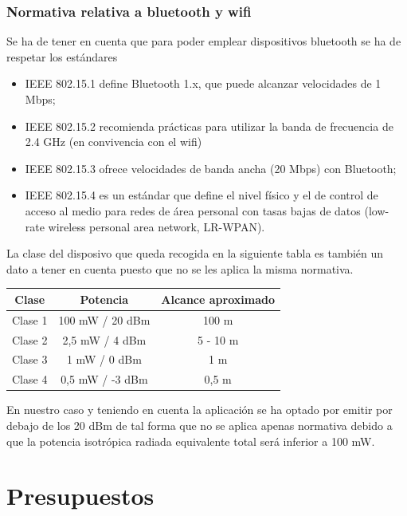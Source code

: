 \documentclass[a4paper ,12pt, onecolumn]{article}
\begin{document}
        \subsubsection{Normativa relativa a bluetooth y wifi}
            Se ha de tener en cuenta que para poder emplear dispositivos bluetooth se ha de respetar los estándares
            \begin{itemize}
                \item IEEE 802.15.1 define Bluetooth 1.x, que puede alcanzar velocidades de 1 Mbps;
                \item IEEE 802.15.2 recomienda prácticas para utilizar la banda de frecuencia de 2.4 GHz (en convivencia con el wifi)
                \item IEEE 802.15.3 ofrece velocidades de banda ancha (20 Mbps) con Bluetooth;
                \item IEEE 802.15.4 es un estándar que define el nivel físico y el de control de acceso al medio 
                para redes de área personal con tasas bajas de datos (low-rate wireless personal area network, LR-WPAN).
            \end{itemize}
            La clase del disposivo que queda recogida en la siguiente tabla es también un dato a tener en cuenta puesto que no 
            se les aplica la misma normativa.
            \begin{center}
                \begin{tabular}{||c | c |c ||} 
                \hline
                Clase & Potencia  & Alcance aproximado\\ [0.5ex] 
                \hline\hline
                Clase 1 & 100 mW / 20 dBm & 100 m \\ 
                Clase 2 & 2,5 mW / 4 dBm & 5 - 10 m \\ 
                Clase 3 & 1 mW / 0 dBm & 1 m \\ 
                Clase 4 & 0,5 mW / -3 dBm & 0,5 m \\ 
                \hline
                \end{tabular}
            \end{center}
            En nuestro caso y teniendo en cuenta la aplicación se ha optado por emitir por debajo de los 20 dBm de tal forma
            que no se aplica apenas normativa debido a que la potencia isotrópica radiada equivalente total será
            inferior a 100 mW.
\section{Presupuestos}
\end{document}
